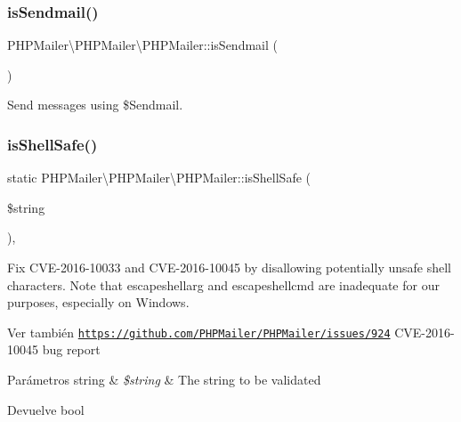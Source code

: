 \subsubsection{\texorpdfstring{is\+Sendmail()}{isSendmail()}}
{\footnotesize\ttfamily P\+H\+P\+Mailer\textbackslash{}\+P\+H\+P\+Mailer\textbackslash{}\+P\+H\+P\+Mailer\+::is\+Sendmail (\begin{DoxyParamCaption}{ }\end{DoxyParamCaption})}

Send messages using \$\+Sendmail. \mbox{\label{classPHPMailer_1_1PHPMailer_1_1PHPMailer_a2dea4de035a3f823cb341c8488dffe75}} 
\subsubsection{\texorpdfstring{is\+Shell\+Safe()}{isShellSafe()}}
{\footnotesize\ttfamily static P\+H\+P\+Mailer\textbackslash{}\+P\+H\+P\+Mailer\textbackslash{}\+P\+H\+P\+Mailer\+::is\+Shell\+Safe (\begin{DoxyParamCaption}\item[{}]{\$string }\end{DoxyParamCaption})\hspace{0.3cm}{\ttfamily [static]}, {\ttfamily [protected]}}

Fix C\+V\+E-\/2016-\/10033 and C\+V\+E-\/2016-\/10045 by disallowing potentially unsafe shell characters. Note that escapeshellarg and escapeshellcmd are inadequate for our purposes, especially on Windows.

\begin{DoxySeeAlso}{Ver también}
\href{https://github.com/PHPMailer/PHPMailer/issues/924}{\tt https\+://github.\+com/\+P\+H\+P\+Mailer/\+P\+H\+P\+Mailer/issues/924} C\+V\+E-\/2016-\/10045 bug report
\end{DoxySeeAlso}

\begin{DoxyParams}[1]{Parámetros}
string & {\em \$string} & The string to be validated\\
\hline
\end{DoxyParams}
\begin{DoxyReturn}{Devuelve}
bool 
\end{DoxyReturn}
\mbox{\label{classPHPMailer_1_1PHPMailer_1_1PHPMailer_ade9300b24162e685f7b3bb27d77ce523}} 
